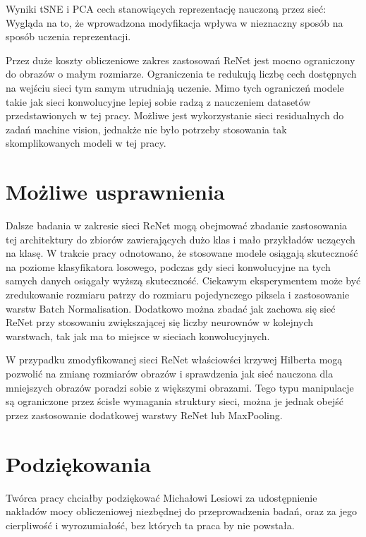 \documentclass[oneside, mag]{mgr}
\begin{document}
Wyniki tSNE i PCA cech stanowiących reprezentację nauczoną przez sieć: Wygląda na to, że wprowadzona modyfikacja wpływa w nieznaczny sposób na sposób uczenia reprezentacji.

Przez duże koszty obliczeniowe zakres zastosowań ReNet jest mocno ograniczony do obrazów o małym rozmiarze. Ograniczenia te redukują liczbę cech dostępnych na wejściu sieci tym samym utrudniają uczenie. Mimo tych ograniczeń modele takie jak sieci konwolucyjne lepiej sobie radzą z nauczeniem datasetów przedstawionych w tej pracy. Możliwe jest wykorzystanie sieci residualnych do zadań machine vision, jednakże nie było potrzeby stosowania tak skomplikowanych modeli w tej pracy.

\section{Możliwe usprawnienia}

Dalsze badania w zakresie sieci ReNet mogą obejmować zbadanie zastosowania tej architektury do zbiorów zawierających dużo klas i mało przykładów uczących na klasę. W trakcie pracy odnotowano, że stosowane modele osiągają skuteczność na poziome klasyfikatora losowego, podczas gdy sieci konwolucyjne na tych samych danych osiągały wyższą skuteczność. Ciekawym eksperymentem może być zredukowanie rozmiaru patrzy do rozmiaru pojedynczego piksela i zastosowanie warstw Batch Normalisation. Dodatkowo można zbadać jak zachowa się sieć ReNet przy stosowaniu zwiększającej się liczby neurownów w kolejnych warstwach, tak jak ma to miejsce w sieciach konwolucyjnych.

W przypadku zmodyfikowanej sieci ReNet właściowści krzywej Hilberta mogą pozwolić na zmianę rozmiarów obrazów i sprawdzenia jak sieć nauczona dla mniejszych obrazów poradzi sobie z większymi obrazami. Tego typu manipulacje są ograniczone przez ścisłe wymagania struktury sieci, można je jednak obejść przez zastosowanie dodatkowej warstwy ReNet lub MaxPooling.

\section{Podziękowania}

Twórca pracy chciałby podziękować Michałowi Lesiowi za udostępnienie nakładów mocy obliczeniowej niezbędnej do przeprowadzenia badań, oraz za jego cierpliwość i wyrozumiałość, bez których ta praca by nie powstała.



\listoffigures
\end{document}

